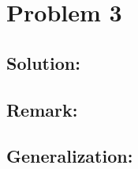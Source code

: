 \section*{Problem 3}

\vspace{4mm}

\subsection*{Solution:}


\subsection*{Remark:}


\subsection*{Generalization:}




